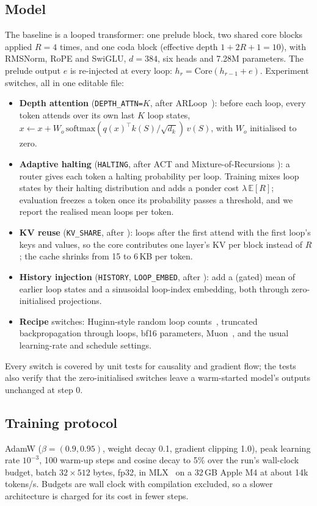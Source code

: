 \subsection{Model}
The baseline is a looped transformer: one prelude block, two shared core blocks applied $R=4$ times,
and one coda block (effective depth $1+2R+1=10$), with RMSNorm, RoPE and SwiGLU, $d=384$, six heads and
7.28M parameters. The prelude output $e$ is re-injected at every loop: $h_{r}=\mathrm{Core}(h_{r-1}+e)$.
Experiment switches, all in one editable file:
\begin{itemize}
\item \textbf{Depth attention} (\texttt{DEPTH\_ATTN=$K$}, after ARLoop~\citep{yao2026arloop}): before each
  loop, every token attends over its own last $K$ loop states,
  $x \leftarrow x + W_o\,\mathrm{softmax}(q(x)^\top k(S)/\sqrt{d_k})\,v(S)$, with $W_o$ initialised
  to zero.
\item \textbf{Adaptive halting} (\texttt{HALTING}, after ACT and Mixture-of-Recursions
  \citep{graves2016adaptive,bae2025mixture}): a router gives each token a halting probability per loop.
  Training mixes loop states by their halting distribution and adds a ponder cost $\lambda\,\mathbb{E}[R]$;
  evaluation freezes a token once its probability passes a threshold, and we report the realised mean
  loops per token.
\item \textbf{KV reuse} (\texttt{KV\_SHARE}, after \citep{huang2026looped,licakova2026kvreplay}): loops
  after the first attend with the first loop's keys and values, so the core contributes one layer's KV
  per block instead of $R$; the cache shrinks from 15 to 6\,KB per token.
\item \textbf{History injection} (\texttt{HISTORY}, \texttt{LOOP\_EMBED}, after
  \citep{zhuang2026recurrence}): add a (gated) mean of earlier loop states and a sinusoidal loop-index
  embedding, both through zero-initialised projections.
\item \textbf{Recipe} switches: Huginn-style random loop counts~\citep{geiping2025scaling}, truncated
  backpropagation through loops, bf16 parameters, Muon~\citep{jordan2024muon}, and the usual learning-rate
  and schedule settings.
\end{itemize}
Every switch is covered by unit tests for causality and gradient flow; the tests also verify that the
zero-initialised switches leave a warm-started model's outputs unchanged at step 0.

\subsection{Training protocol}
AdamW ($\beta=(0.9,0.95)$, weight decay 0.1, gradient clipping 1.0), peak learning rate $10^{-3}$, 100
warm-up steps and cosine decay to 5\% over the run's wall-clock budget, batch $32\times512$ bytes, fp32,
in MLX~\citep{mlx2023} on a 32\,GB Apple M4 at about 14k tokens/s. Budgets are wall clock with
compilation excluded, so a slower architecture is charged for its cost in fewer steps.

